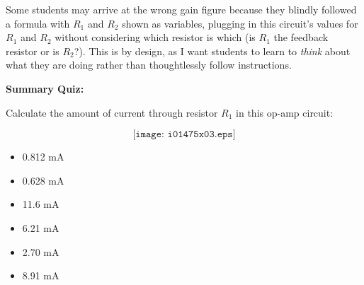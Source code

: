 Some students may arrive at the wrong gain figure because they blindly followed a formula with $R_1$ and $R_2$ shown as variables, plugging in this circuit's values for $R_1$ and $R_2$ without considering which resistor is which (is $R_1$ the feedback resistor or is $R_2$?).  This is by design, as I want students to learn to {\it think} about what they are doing rather than thoughtlessly follow instructions.





\vfil \eject

\noindent
{\bf Summary Quiz:}

Calculate the amount of current through resistor $R_1$ in this op-amp circuit:

$$\texttt{[image: i01475x03.eps]}$$

\begin{itemize}
\item{} 0.812 mA
\vskip 5pt 
\item{} 0.628 mA
\vskip 5pt 
\item{} 11.6 mA
\vskip 5pt 
\item{} 6.21 mA
\vskip 5pt 
\item{} 2.70 mA
\vskip 5pt 
\item{} 8.91 mA
\end{itemize}






